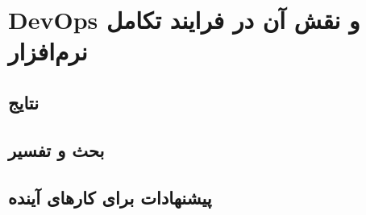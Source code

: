 \chapter{DevOps و نقش آن در فرایند تکامل نرم‌افزار}
\label{ch:conclusion}

\section{نتایج}
\label{sec:ch3-results}


\section{بحث و تفسیر}
\label{sec:ch3-discussion}


\section{پیشنهادات برای کارهای آینده}
\label{sec:ch3-future}


